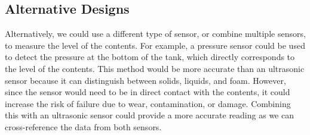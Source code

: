 \documentclass{article}
\begin{document}
\subsection{Alternative Designs}
Alternatively, we could use a different type of sensor, or combine multiple sensors, to measure the level of the contents. For example, a pressure sensor could be used to detect the pressure at the bottom of the tank, which directly corresponds to the level of the contents. This method would be more accurate than an ultrasonic sensor because it can distinguish between solids, liquids, and foam. However, since the sensor would need to be in direct contact with the contents, it could increase the risk of failure due to wear, contamination, or damage. Combining this with an ultrasonic sensor could provide a more accurate reading as we can cross-reference the data from both sensors.
\end{document}
